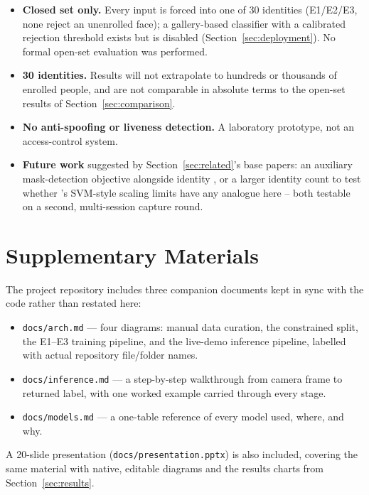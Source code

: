 \documentclass[11pt]{article}
\begin{document}
\begin{itemize}
\item \textbf{Closed set only.} Every input is forced into one of 30 identities (E1/E2/E3, none reject an unenrolled face); a gallery-based classifier with a calibrated rejection threshold exists but is disabled (Section~\ref{sec:deployment}). No formal open-set evaluation was performed.
\item \textbf{30 identities.} Results will not extrapolate to hundreds or thousands of enrolled people, and are not comparable in absolute terms to the open-set results of Section~\ref{sec:comparison}.
\item \textbf{No anti-spoofing or liveness detection.} A laboratory prototype, not an access-control system.
\item \textbf{Future work} suggested by Section~\ref{sec:related}'s base papers: an auxiliary mask-detection objective alongside identity \cite{montero2022mtarcface}, or a larger identity count to test whether \cite{chong2022svm}'s SVM-style scaling limits have any analogue here -- both testable on a second, multi-session capture round.
\end{itemize}

\section{Supplementary Materials}
\label{sec:supplementary}

The project repository includes three companion documents kept in sync with the code rather than restated here:

\begin{itemize}
\item \texttt{docs/arch.md} — four diagrams: manual data curation, the constrained split, the E1--E3 training pipeline, and the live-demo inference pipeline, labelled with actual repository file/folder names.
\item \texttt{docs/inference.md} — a step-by-step walkthrough from camera frame to returned label, with one worked example carried through every stage.
\item \texttt{docs/models.md} — a one-table reference of every model used, where, and why.
\end{itemize}

A 20-slide presentation (\texttt{docs/presentation.pptx}) is also included, covering the same material with native, editable diagrams and the results charts from Section~\ref{sec:results}.
\end{document}
